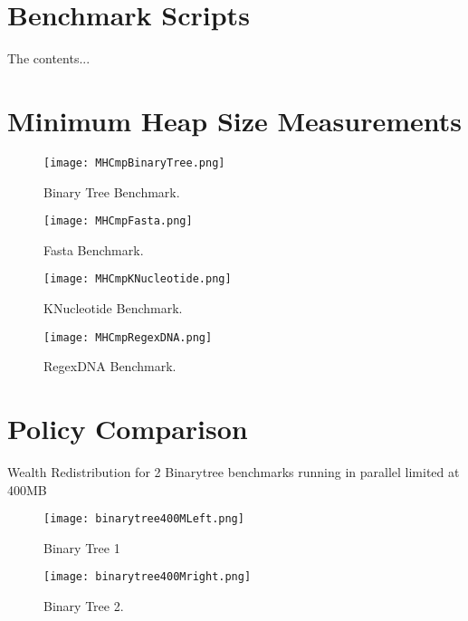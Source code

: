 \documentclass{l4proj}
\begin{document}
\begin{appendices}
\chapter{Benchmark Scripts}
The contents...
\chapter{Minimum Heap Size Measurements}
\label{minheapsize}
\begin{figure}[!ht]
  \centering
    \texttt{[image: MHCmpBinaryTree.png]}
    \caption{Binary Tree Benchmark.}
\end{figure}

\begin{figure}[!ht]
  \centering
    \texttt{[image: MHCmpFasta.png]}
    \caption{Fasta Benchmark.}
\end{figure}

\begin{figure}[!ht]
  \centering
    \texttt{[image: MHCmpKNucleotide.png]}
    \caption{KNucleotide Benchmark.}
\end{figure}

\begin{figure}[!ht]
  \centering
    \texttt{[image: MHCmpRegexDNA.png]}
    \caption{RegexDNA Benchmark.}
\end{figure}
\chapter{Policy Comparison}
Wealth Redistribution for 2 Binarytree benchmarks running in parallel limited at 400MB
\begin{figure}[!ht]
  \centering
    \texttt{[image: binarytree400MLeft.png]}
    \caption{Binary Tree 1}
\end{figure}

\begin{figure}[!ht]
  \centering
    \texttt{[image: binarytree400Mright.png]}
    \caption{Binary Tree 2.}
\end{figure}

\end{appendices}
\end{document}
